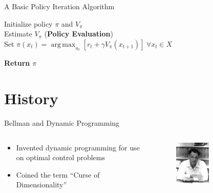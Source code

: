 \documentclass{beamer}
\DeclareMathOperator*{\argmax}{arg\,max}
\begin{document}
\begin{frame}{A Basic Policy Iteration Algorithm}
  \begin{algorithm}[H]
      \DontPrintSemicolon

      Initialize policy $\pi$ and $V_\pi$ \\
       {
        Estimate $V_\pi$ (\textbf{Policy Evaluation}) \\
        Set $\pi(x_t) = \argmax_{u_t} \left[r_t +  \gamma V_\pi(x_{t+1})\right]\ \forall x_t \in X$ \\ 
      }

      \textbf{Return} $\pi$

      \caption{Policy Iteration}
      \label{alg:stability_policy_iteration}
  \end{algorithm}
\end{frame}

\section{History}

\begin{frame}{Bellman and Dynamic Programming}
  \begin{columns}
    \begin{column}{0.48\textwidth}
      \begin{itemize}
        \item Invented dynamic programming for use on optimal control problems
        \item Coined the term ``Curse of Dimensionality''
      \end{itemize}
    \end{column}
    \begin{column}{0.48\textwidth}
      \begin{figure}
        \includegraphics[keepaspectratio,width=0.5\textwidth]{assets/bellman}
      \end{figure}
    \end{column}
  \end{columns}
\end{frame}
\end{document}
